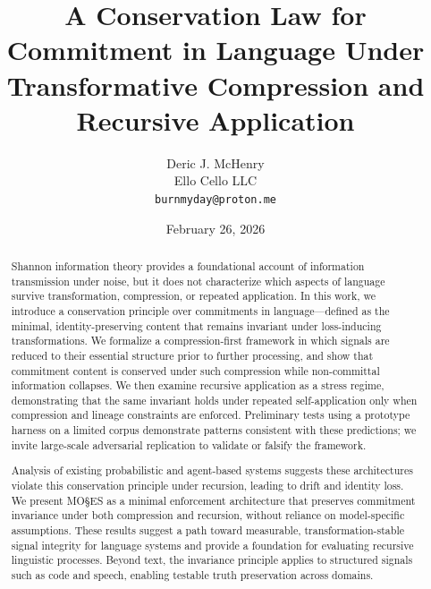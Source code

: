 \documentclass[11pt,a4paper]{article}
\title{A Conservation Law for Commitment in Language Under Transformative Compression and Recursive Application}
\author{
    Deric J. McHenry \\
    Ello Cello LLC \\
    \texttt{burnmyday@proton.me}
}
\date{February 26, 2026\footnotemark}
\begin{document}
\maketitle


\begin{abstract}
Shannon information theory provides a foundational account of information transmission under noise, but it does not characterize which aspects of language survive transformation, compression, or repeated application. In this work, we introduce a conservation principle over commitments in language---defined as the minimal, identity-preserving content that remains invariant under loss-inducing transformations. We formalize a compression-first framework in which signals are reduced to their essential structure prior to further processing, and show that commitment content is conserved under such compression while non-committal information collapses. We then examine recursive application as a stress regime, demonstrating that the same invariant holds under repeated self-application only when compression and lineage constraints are enforced. Preliminary tests using a prototype harness on a limited corpus demonstrate patterns consistent with these predictions; we invite large-scale adversarial replication to validate or falsify the framework.

Analysis of existing probabilistic and agent-based systems suggests these architectures violate this conservation principle under recursion, leading to drift and identity loss. We present MO\S{}ES\texttrademark{} as a minimal enforcement architecture that preserves commitment invariance under both compression and recursion, without reliance on model-specific assumptions. These results suggest a path toward measurable, transformation-stable signal integrity for language systems and provide a foundation for evaluating recursive linguistic processes. Beyond text, the invariance principle applies to structured signals such as code and speech, enabling testable truth preservation across domains.
\end{abstract}
\end{document}
